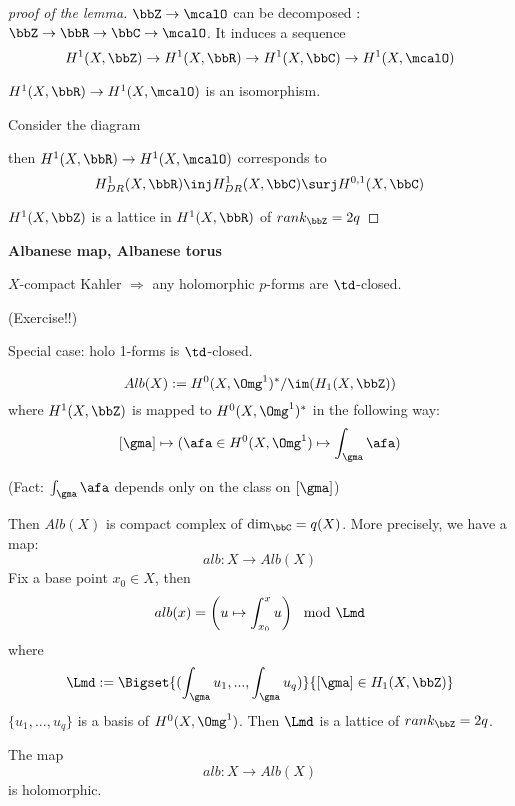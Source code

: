 \begin{proof}[proof of the lemma]

$\bbZ\to\mcalO$ can be decomposed : $\bbZ\to\bbR\to\bbC\to\mcalO$. 
It induces a sequence
$$H^1(X,\bbZ)\to H^1(X,\bbR)\to H^1(X,\bbC)\to H^1(X,\mcalO)$$

$H^1(X,\bbR)\to H^1(X,\mcalO)$ is an isomorphism.

Consider the diagram

then $H^1(X,\bbR)\to H^1(X,\mcalO)$ corresponds to
$$
  H^1_{DR}(X,\bbR)\inj H^1_{DR}(X,\bbC)\surj H^{0,1}(X,\bbC)
$$

$H^1(X,\bbZ)$ is a lattice in $H^1(X,\bbR)$ of $rank_{\bbZ}=2q$
\end{proof}

\textbf{Albanese map, Albanese torus}

$X$-compact Kahler $\Rightarrow$ any holomorphic $p$-forms are $\td$-closed.

(Exercise!!)

Special case: holo 1-forms is $\td$-closed.

$$Alb(X):=H^0(X,\Omg^1)^*/\im(H_1(X,\bbZ))$$
where $H^1(X,\bbZ)$ is mapped to
$H^0(X,\Omg^1)^*$ in the following way:
$$[\gma]\mapsto(\afa\in H^0(X,\Omg^1)\mapsto\int_\gma\afa)$$

(Fact: $\int_\gma\afa$ depends only on the class on $[\gma]$)

Then $Alb(X)$ is compact complex of $\dim_\bbC=q(X)$.
More precisely, we have a map:
$$alb: X\to Alb(X)$$
Fix a base point $x_0\in X$, then 
$$alb(x)=
\left(
  u\mapsto
  \int_{x_0}^x u
\right)\mod\Lmd
$$
where 
$$\Lmd:=\Bigset{(\int_\gma u_1,...,\int_\gma u_q)}
{[\gma]\in H_1(X,\bbZ)}$$
$\{u_1,...,u_q\}$ is a basis of $H^0(X,\Omg^1)$.
Then $\Lmd$ is a lattice of $rank_\bbZ=2q$.

The map 
$$alb: X\to Alb(X)$$
is holomorphic. 




